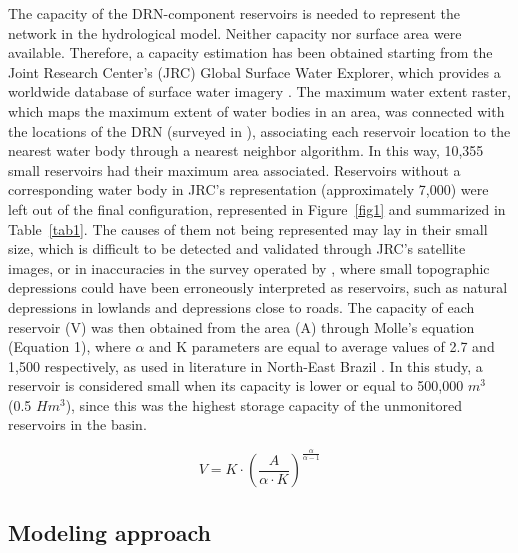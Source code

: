 \documentclass[draft]{agujournal2019}
\begin{document}
The capacity of the DRN-component reservoirs is needed to represent the network in the hydrological model.  Neither capacity nor surface area were available. Therefore, a capacity estimation has been obtained starting from the Joint Research Center’s (JRC) Global Surface Water Explorer, which provides a worldwide database of surface water imagery \cite{Pekel2016}. The maximum water extent raster, which maps the maximum extent of water bodies in an area, was connected with the locations of the DRN (surveyed in ), associating each reservoir location to the nearest water body through a nearest neighbor algorithm. In this way, 10,355 small reservoirs had their maximum area associated. Reservoirs without a corresponding water body in JRC’s representation (approximately 7,000) were left out of the final configuration, represented in Figure~\ref{fig1} and summarized in Table~\ref{tab1}. The causes of them not being represented may lay in their small size, which is difficult to be detected and validated through JRC’s satellite images, or in inaccuracies in the survey operated by , where small topographic depressions could have been erroneously interpreted as reservoirs, such as natural depressions in lowlands and depressions close to roads. The capacity of each reservoir (V) was then obtained from the area (A) through Molle’s equation (Equation 1), where $\alpha$ and K parameters are equal to average values of 2.7 and 1,500 respectively, as used in literature in North-East Brazil \cite{Mamede2018,Mamede2012,Molle1994}. In this study, a reservoir is considered small when its capacity is lower or equal to 500,000 $m^3$ (0.5 $Hm^3$), since this was the highest storage capacity of the unmonitored reservoirs in the basin.
\begin{linenomath*}
	\begin{equation}
	V = K \cdot (\frac{A}{\alpha\cdot K})^\frac{\alpha}{\alpha -1}
	\end{equation}
\end{linenomath*}

\subsection{Modeling approach}\label{sec:model}
\end{document}
